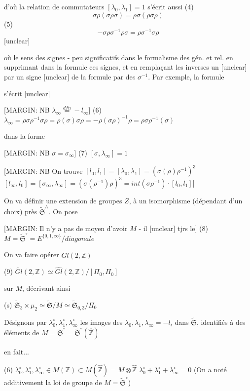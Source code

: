 d'où la relation de commutateurs $[\lambda_0, \lambda_1] = 1$ s'écrit
aussi
(4) $$\sigma \rho (\sigma \rho \sigma) = \rho \sigma (\rho \sigma \rho)$$
(5) $$- \sigma \rho \sigma^{-1} \rho \sigma = \rho \sigma^{-1} \sigma \rho$$ [unclear]

où le sens des signes - peu significatifs
dans le formalisme des gén. et rel. en supprimant
dans la formule ces signes, et en remplaçant les
inverses un [unclear] par un signe [unclear] de
la formule par des $\sigma^{-1}$. Par exemple, la formule

\newpage


s'écrit [unclear]

[MARGIN: NB $\lambda_{\infty} \overset{dfn}{=} -l_{\infty}$]
(6) $\lambda_{\infty} = \rho \sigma \rho^{-1} \sigma \rho = \rho (\sigma) \sigma \rho = - \rho (\sigma \rho)^{-1} \rho = \rho \sigma \rho^{-1}(\sigma)$

dans la forme

[MARGIN: NB $\sigma = \sigma_{\infty}$]
(7) $[\sigma, \lambda_{\infty}] = 1$

[MARGIN: NB On trouve
$[l_0, l_1] = [\lambda_0, \lambda_1] = (\sigma(\rho) \rho^{-1})^3$
$[l_{\infty}, l_0] = [\sigma_{\infty}, \lambda_{\infty}] = (\sigma (\rho^{-1}) \rho)^3 = int(\sigma \rho^{-1}) \cdot [l_0, l_1]$]

On va définir une extension de groupes
$Z$, à un isomorphisme (dépendant d'un choix) près
$\tilde{\mathfrak{S}}^\wedge$. On pose

[MARGIN: Il n'y a pas de moyen d'avoir $M$ - il [unclear] tjrs le]
(8) $M = \tilde{\mathfrak{S}}^\circ = E^{\{0, 1, \infty\}} / diagonale$

On va faire opérer $\widehat{Gl}(2, \mathbb{Z})$

(9) $\widetilde{Gl}(2, \mathbb{Z}) \simeq \widehat{Gl}(2, \mathbb{Z}) / [\Pi_0, \Pi_0]$

sur $M$, décrivant ainsi

(s) $\tilde{\mathfrak{S}}_3 \times \mu_2 \simeq \tilde{\mathfrak{S}} / M \simeq \tilde{\mathfrak{S}}_{0,3} / \Pi_0$

Désignons par $\lambda_0^\circ, \lambda_1^\circ, \lambda_{\infty}^\circ$ les images des
$\lambda_0, \lambda_1, \lambda_{\infty} = -l_i$ dans $\tilde{\mathfrak{S}}$, identifiés
à des éléments de $M = \tilde{\mathfrak{S}}^\circ = \tilde{\mathfrak{S}}^\circ(\hat{\mathbb{Z}})$

en fait...

(6) $\lambda_0^\circ, \lambda_1^\circ, \lambda_{\infty}^\circ \in M(\mathbb{Z}) \subset M(\hat{\mathbb{Z}}) = M \otimes \hat{\mathbb{Z}}$
$\lambda_0^\circ + \lambda_1^\circ + \lambda_{\infty}^\circ = 0$ (On a noté additivement la loi de groupe de $M = \tilde{\mathfrak{S}}^\circ$)

